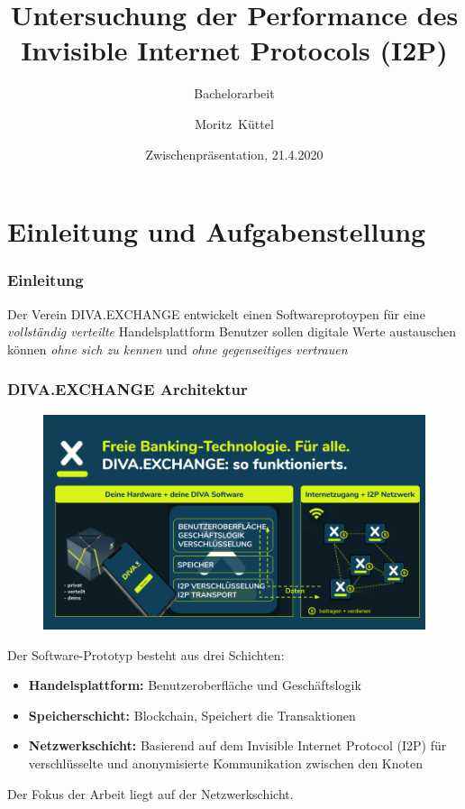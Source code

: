 \documentclass{beamer}
\title %
{Untersuchung der Performance des Invisible Internet Protocols (I2P)}
\subtitle{Bachelorarbeit}
\author[mkuettel] %
{Moritz~Küttel}
\institute[Hochschule Luzern Informatik] %
{
  Hochschule Luzern Informatik\newline
  \and
  in Zusammenarbeit mit
  \and
  DIVA.EXCHANGE
}
\date[21.4.2021] %
{Zwischenpräsentation, 21.4.2020}
\begin{document}
    \begin{frame}
        \maketitle
    \end{frame}

\section{Einleitung und Aufgabenstellung}
    \begin{frame}
        \frametitle{Einleitung}
        \begin{center}
            Der Verein DIVA.EXCHANGE entwickelt einen Softwareprotoypen für eine \textit{vollständig verteilte} Handelsplattform
            \vfill
            Benutzer sollen digitale Werte austauschen können
            \vfill
            \textit{ohne sich zu kennen}
            \vfill
            und
            \vfill
            \textit{ohne gegenseitiges vertrauen}
        \end{center}
    \end{frame}




    \begin{frame}[allowframebreaks]
        \frametitle{DIVA.EXCHANGE Architektur}

        \begin{figure}[thp!]
            \includegraphics[width=1.0\textwidth]{img/divax-overview.png}
        \end{figure}


        Der Software-Prototyp besteht aus drei Schichten:

        \begin{itemize}
            \item \textbf{Handelsplattform:} Benutzeroberfläche und Geschäftslogik
            \item \textbf{Speicherschicht:} Blockchain, Speichert die Transaktionen
            \item \textbf{Netzwerkschicht:} Basierend auf dem Invisible Internet Protocol (I2P) für verschlüsselte und anonymisierte Kommunikation zwischen den Knoten
        \end{itemize}

        Der Fokus der Arbeit liegt auf der Netzwerkschicht.
    \end{frame}
\end{document}
